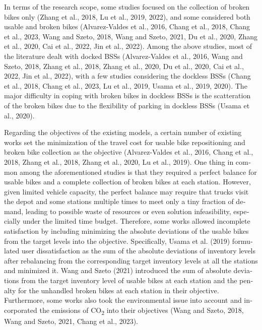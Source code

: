 \documentclass[
  english,
]{article}
\begin{document}
\begin{otherlanguage}{english}
\protect{}\label{p0120}
In terms of the research scope, some studies focused on the collection of broken bikes only (Zhang
et al., 2018, Lu et al., 2019, 2022), and some considered both usable and broken bikes
(Alvarez-Valdes et al., 2016, Chang et al., 2018, Chang et al., 2023, Wang and Szeto, 2018, Wang and
Szeto, 2021, Du et al., 2020, Zhang et al., 2020, Cai et al., 2022, Jin et al., 2022). Among the
above studies, most of the literature dealt with docked BSSs (Alvarez-Valdes et al., 2016, Wang and
Szeto, 2018, Zhang et al., 2018, Zhang et al., 2020, Du et al., 2020, Cai et al., 2022, Jin et al.,
2022), with a few studies considering the dockless BSSs (Chang et al., 2018, Chang et al., 2023, Lu
et al., 2019, Usama et al., 2019, 2020). The major difficulty in coping with broken bikes in
dockless BSSs is the scatteration of the broken bikes due to the flexibility of parking in dockless
BSSs (Usama et al., 2020).

\protect{}\label{p0125}
Regarding the objectives of the existing models, a certain number of existing works set the
minimization of the travel cost for usable bike repositioning and broken bike collection as the
objective (Alvarez-Valdes et al., 2016, Chang et al., 2018, Zhang et al., 2018, Zhang et al., 2020,
Lu et al., 2019). One thing in common among the aforementioned studies is that they required a
perfect balance for usable bikes and a complete collection of broken bikes at each station. However,
given limited vehicle capacity, the perfect balance may require that trucks visit the depot and some
stations multiple times to meet only a tiny fraction of demand, leading to possible waste of
resources or even solution infeasibility, especially under the limited time budget. Therefore, some
works allowed incomplete satisfaction by including minimizing the absolute deviations of the usable
bikes from the target levels into the objective. Specifically, Usama et al. (2019) formulated user
dissatisfaction as the sum of the absolute deviations of inventory levels after rebalancing from the
corresponding target inventory levels at all the stations and minimized it. Wang and Szeto (2021)
introduced the sum of absolute deviations from the target inventory level of usable bikes at each
station and the penalty for the unhandled broken bikes at each station in their objective.
Furthermore, some works also took the environmental issue into account and incorporated the
emissions of CO\textsubscript{2} into their objectives (Wang and Szeto, 2018, Wang and Szeto, 2021,
Chang et al., 2023).


\end{otherlanguage}
\end{document}
